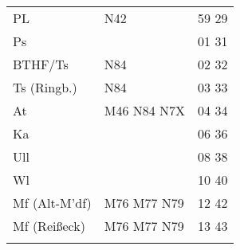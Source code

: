 \begin{tabular}{!{\color{schiefergrau}\vrule width 3pt}*{3}{l!{\color{schiefergrau}\vrule width 3pt}}}
PL           & \nbus{} N42                         & 59 29 \\
Ps           &                                     & 01 31 \\
BTHF/Ts      & \nbus{} N84                         & 02 32 \\
Ts (Ringb.)  & \nbus{} N84                         & 03 33 \\
At           & \mbus{} M46 \nbus{} N84 N7X         & 04 34 \\
Ka           &                                     & 06 36 \\
Ull          &                                     & 08 38 \\
Wl           &                                     & 10 40 \\
Mf (Alt-M'df)& \mbus{} M76 M77 \nbus{} N79         & 12 42 \\
Mf (Reißeck) & \mbus{} M76 M77 \nbus{} N79         & 13 43 \\
\myhline
\end{tabular}
%
